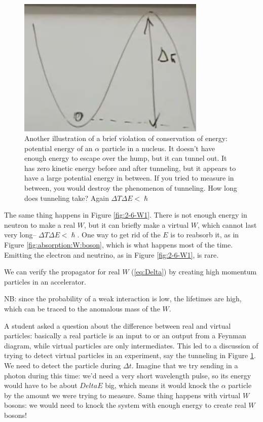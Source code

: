 \documentclass[]{article}
\begin{document}
 \begin{figure}[H]
 	\caption[Another illustration of a brief violation of conservation of energy]{Another illustration of a brief violation of conservation of energy: potential energy of an $\alpha$ particle in a nucleus. It doesn't have enough energy to escape over the hump, but it can tunnel out. It has zero kinetic energy before and after tunneling, but it appears to have a large potential energy in between. If you tried to measure in between, you would destroy the phenomenon of tunneling. How long does tunneling take? Again $\Delta T \Delta E<\hslash$}\label{fig:alpha:tunneling}
 	\includegraphics[width=0.8\textwidth]{particles2-6-pe}
 \end{figure}
 
The same thing happens in Figure \ref{fig:2-6-W1}. There is not enough energy in neutron to make a real $W$, but it can briefly make a virtual $W$, which cannot last very long-- $\Delta T \Delta E<\hslash$. One way to get rid of the $E$ is to reabsorb it, as in Figure \ref{fig:absorption:W:boson}, which is what happens most of the time. Emitting the electron and neutrino, as in Figure \ref{fig:2-6-W1}, is rare.
 
We can verify the propagator for real $W$ (\ref{eq:Delta}) by creating high momentum particles in an accelerator.
 
NB: since the probability of a weak interaction is low, the lifetimes are high, which can be traced to the anomalous mass of the $W$. 

A student asked a question about the difference between real and virtual particles: basically a real particle is an input to or an output from a Feynman diagram, while virtual particles are only intermediates. This led to a discussion of trying to detect virtual particles in an experiment, say the tunneling in Figure \ref{fig:alpha:tunneling}. We need to detect the particle during $\Delta t$. Imagine that we try sending in a photon during this time: we'd need a very short wavelength pulse, so its energy would have to be about $Delta E$ big, which means it would knock the $\alpha$ particle by the amount we were trying to measure. Same thing happens with virtual $W$ bosons: we would need to knock the system with enough energy to create real $W$ bosons!
 
\end{document}
